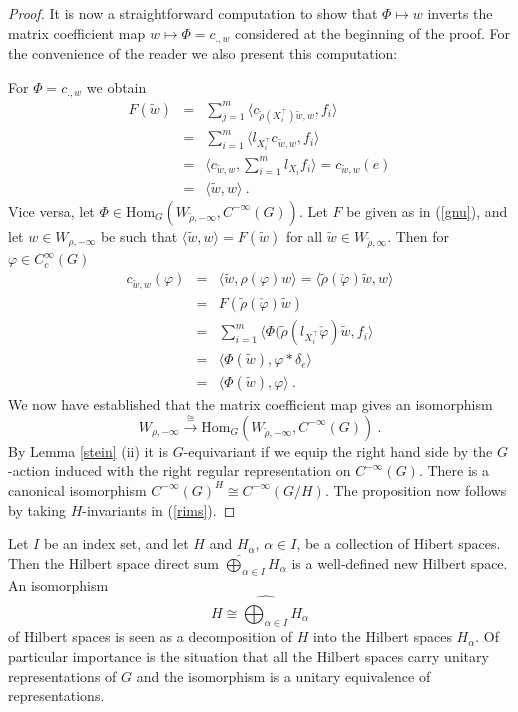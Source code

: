 \documentclass[10]{amsart}
\theoremstyle{remark}
\theoremstyle{definition}
\numberwithin{equation}{section}
\newcommand{\Hom}{\mathrm{Hom}}
\newcommand{\vp}{\varphi}
\newcommand{\be}{\begin{equation}}
\begin{document}
{\begin{proof}
It is now a straightforward computation to show that $\Phi\mapsto w$ inverts the matrix coefficient map $w\mapsto \Phi=c_{.,w}$ considered at the beginning of the proof.
For the convenience of the reader we also present this computation:

For $\Phi=c_{.,w}$ we obtain
\begin{eqnarray*}
 F(\tilde w)&=& \sum_{j=1}^m \langle c_{\tilde\rho(X_i^\top)\tilde w,w}, f_i\rangle\\
&=& \sum_{i=1}^m \langle l_{X_i^\top}c_{\tilde w,w}, f_i\rangle\\
&=& \langle c_{\tilde w,w}, \sum_{i=1}^m l_{X_i}f_i\rangle = c_{\tilde w,w}(e)\\
&=& \langle \tilde w, w\rangle\ .
\end{eqnarray*}
Vice versa, let $\Phi\in \Hom_G(W_{\tilde\rho,-\infty},C^{-\infty}(G))$. Let $F$ be given as in (\ref{gnu}), and let $w\in W_{\rho,-\infty}$ be such that 
$\langle \tilde w, w\rangle = F(\tilde w)$
for all $\tilde w \in W_{\tilde\rho,\infty}$. Then for $\vp\in C_c^\infty(G)$
\begin{eqnarray*}
c_{\tilde w,w}(\vp)&=&\langle \tilde w,\rho(\vp)w\rangle =\langle \tilde\rho(\check\vp)\tilde w,w\rangle\\
&=& F( \tilde\rho(\check\vp)\tilde w)\\
&=&\sum_{i=1}^m \langle \Phi(\tilde\rho(l_{X_i^\top}\check\vp)\tilde w, f_i\rangle\\
&=& \langle \Phi(\tilde w),\vp*\delta_e\rangle\\
&=& \langle \Phi(\tilde w),\vp\rangle\ .
\end{eqnarray*}
We now have established that the matrix coefficient map gives an isomorphism 
\be \label{rims} W_{\rho,-\infty}\stackrel{\cong}{\longrightarrow} \Hom_G(W_{\tilde\rho,-\infty},C^{-\infty}(G))\ .
\end{equation}
By Lemma \ref{stein} (ii) it is $G$-equivariant if we equip the right hand side by the $G$-action induced with the right regular representation on $C^{-\infty}(G)$.
There is a canonical isomorphism $C^{-\infty}(G)^H\cong C^{-\infty}(G/H)$. The proposition now follows by taking $H$-invariants in (\ref{rims}).
\end{proof}

Let $I$ be an index set, and let $H$ and $H_\alpha$, $\alpha\in I$, be a collection of Hibert spaces. Then the Hilbert space direct sum $\widehat{\bigoplus}_{\alpha\in I} H_\alpha$ is
a well-defined new Hilbert space. An isomorphism
$$    H\cong \widehat{\bigoplus_{\alpha\in I}} H_\alpha $$
of Hilbert spaces is seen as a decomposition of $H$ into the Hilbert spaces $H_\alpha$. Of particular importance is the situation that all the Hilbert spaces carry unitary representations
of $G$ and the isomorphism is a unitary equivalence of representations.

}
\end{document}
